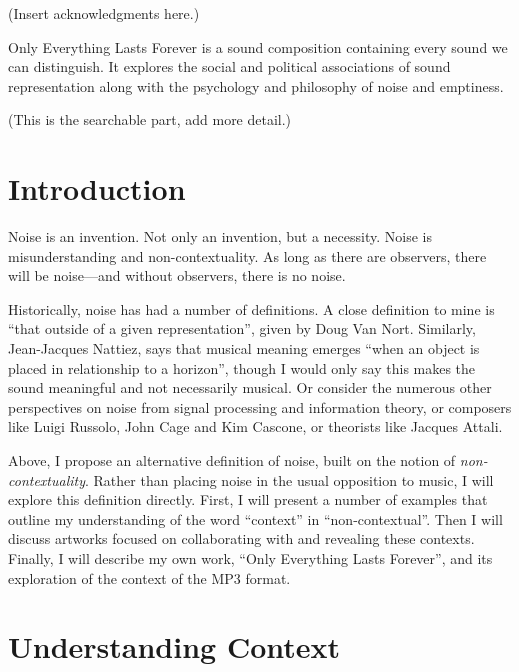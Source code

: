 \documentclass{thesis}
\author{Kyle McDonald}
\begin{document}
 
\titlepage
\tableofcontents
\listoffigures %


(Insert acknowledgments here.)


Only Everything Lasts Forever is a sound composition containing every sound we can distinguish. It explores the social and political associations of sound representation along with the psychology and philosophy of noise and emptiness.

(This is the searchable part, add more detail.)

\chapter{Introduction}

Noise is an invention. Not only an invention, but a necessity. Noise is misunderstanding and non-contextuality. As long as there are observers, there will be noise---and without observers, there is no noise.

Historically, noise has had a number of definitions. A close definition to mine is ``that outside of a given representation'', given by Doug Van Nort\cite{Vannort06}. Similarly, Jean-Jacques Nattiez\cite{nattiez_music_1990}, says that musical meaning emerges ``when an object is placed in relationship to a horizon'', though I would only say this makes the sound meaningful and not necessarily musical. Or consider the numerous other perspectives on noise from signal processing and information theory, or composers like Luigi Russolo\cite{Russolo04}, John Cage\cite{Cage61} and Kim Cascone\cite{Cascone00}, or theorists like Jacques Attali\cite{Attali85}.

Above, I propose an alternative definition of noise, built on the notion of \emph{non-contextuality}. Rather than placing noise in the usual opposition to music, I will explore this definition directly. First, I will present a number of examples that outline my understanding of the word ``context'' in ``non-contextual''. Then I will discuss artworks focused on collaborating with and revealing these contexts. Finally, I will describe my own work, ``Only Everything Lasts Forever'', and its exploration of the context of the MP3 format.

\chapter{Understanding Context}
\end{document}
